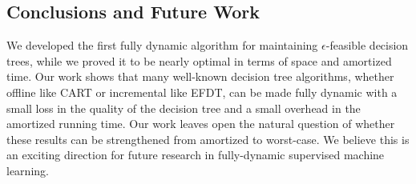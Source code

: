 \subsection{Conclusions and Future Work}
We developed the first fully dynamic algorithm for maintaining $\epsilon$-feasible decision trees, while we proved it to be nearly optimal in terms of space and amortized time. Our work shows that many well-known decision tree algorithms, whether offline like CART or incremental like EFDT, can be made fully dynamic with a small loss in the quality of the decision tree and a small overhead in the amortized running time. Our work leaves open the natural question of whether these results can be strengthened from amortized to worst-case. We believe this is an exciting direction for future research in  fully-dynamic supervised machine learning.
